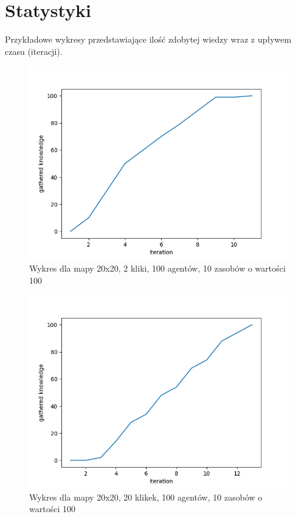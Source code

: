 \section{Statystyki}

Przykładowe wykresy przedstawiające ilość zdobytej wiedzy wraz z upływem czasu (iteracji).
\nopagebreak

\begin{figure}[H]
	\centering
	\includegraphics[width=130mm]{wykresy/learning_map-50x50_graph-2-50_res-10-100_p-1.png}
	\caption{Wykres dla mapy 20x20, 2 kliki, 100 agentów, 10 zasobów o wartości 100}
\end{figure}

\begin{figure}[H]
	\centering
	\includegraphics[width=130mm]{wykresy/learning_map-50x50_graph-20-5_res-10-100_p-1.png}
	\caption{Wykres dla mapy 20x20, 20 klikek, 100 agentów, 10 zasobów o wartości 100}
\end{figure}

